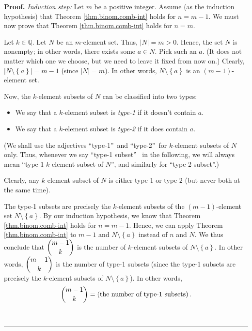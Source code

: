 \documentclass[numbers=enddot,12pt,final,onecolumn,notitlepage]{scrartcl}%
\numberwithin{exer}{subsection}
\theoremstyle{definition}
\newenvironment{proof}[1][Proof]{\noindent\textbf{#1.} }{\ \rule{0.5em}{0.5em}}
\begin{document}
\begin{proof}
\textit{Induction step:} Let $m$ be a positive integer. Assume (as the
induction hypothesis) that Theorem \ref{thm.binom.comb-int} holds for $n=m-1$.
We must now prove that Theorem \ref{thm.binom.comb-int} holds for $n=m$.

Let $k\in\mathbb{Q}$. Let $N$ be an $m$-element set. Thus, $\left\vert
N\right\vert =m>0$. Hence, the set $N$ is nonempty; in other words, there
exists some $a\in N$. Pick such an $a$. (It does not matter which one we
choose, but we need to leave it fixed from now on.) Clearly, $\left\vert
N\setminus\left\{  a\right\}  \right\vert =m-1$ (since $\left\vert
N\right\vert =m$). In other words, $N\setminus\left\{  a\right\}  $ is an
$\left(  m-1\right)  $-element set.

Now, the $k$-element subsets of $N$ can be classified into two types:

\begin{itemize}
\item We say that a $k$-element subset is \textit{type-1} if it doesn't
contain $a$.

\item We say that a $k$-element subset is \textit{type-2} if it does contain
$a$.
\end{itemize}

(We shall use the adjectives \textquotedblleft type-1\textquotedblright\ and
\textquotedblleft type-2\textquotedblright\ for $k$-element subsets of $N$
only. Thus, whenever we say \textquotedblleft type-1 subset\textquotedblright%
\ in the following, we will always mean \textquotedblleft type-1 $k$-element
subset of $N$\textquotedblright, and similarly for \textquotedblleft type-2
subset\textquotedblright.)

Clearly, any $k$-element subset of $N$ is either type-1 or type-2 (but never
both at the same time).

The type-1 subsets are precisely the $k$-element subsets of the $\left(
m-1\right)  $-element set $N\setminus\left\{  a\right\}  $. By our induction
hypothesis, we know that Theorem \ref{thm.binom.comb-int} holds for $n=m-1$.
Hence, we can apply Theorem \ref{thm.binom.comb-int} to $m-1$ and
$N\setminus\left\{  a\right\}  $ instead of $n$ and $N$. We thus conclude that
$\dbinom{m-1}{k}$ is the number of $k$-element subsets of $N\setminus\left\{
a\right\}  $. In other words, $\dbinom{m-1}{k}$ is the number of type-1
subsets (since the type-1 subsets are precisely the $k$-element subsets of
$N\setminus\left\{  a\right\}  $). In other words,%
\begin{equation}
\dbinom{m-1}{k}=\left(  \text{the number of type-1 subsets}\right)  .
\label{pf.thm.binom.comb-int.IS.1}%
\end{equation}



\end{proof}
\end{document}
